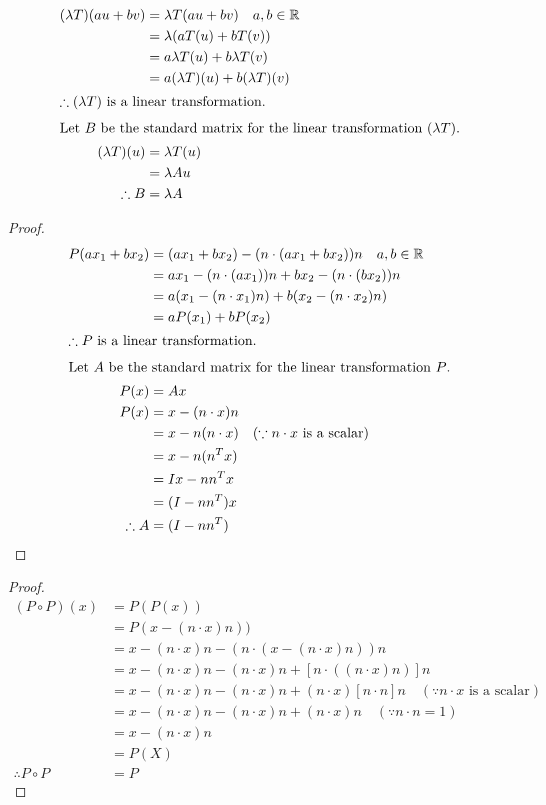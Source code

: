 \documentclass[12pt]{article}
\newenvironment{problem}[2][Problem]{\begin{trivlist}
\item[\hskip \labelsep {\bfseries #1}\hskip \labelsep {\bfseries #2.}]}{\end{trivlist}}
\begin{document}
\begin{problem}{2.b}
\end{problem}
\begin{align*}
(\lambda T)(au + bv) &= \lambda T(au + bv) \quad a, b \in \mathbb{R}\\
&= \lambda (aT(u) + bT(v)) \\
&= a\lambda T(u) + b\lambda T(v) \\
&= a(\lambda T)(u) + b(\lambda T)(v) \\
\intertext{$\therefore (\lambda T)$ is a linear transformation.}
\intertext{Let $B$ be the standard matrix for the linear transformation $(\lambda T)$.}
(\lambda T)(u) &= \lambda T(u)\\ 
&= \lambda Au\\
\therefore B &= \lambda A
\end{align*}
\filbreak

\begin{problem}{3.a}
\end{problem}
\begin{proof}
\begin{align*}
P(ax_1 + bx_2) &= (ax_1 + bx_2) - (n \cdot (ax_1 + bx_2)) n\quad a, b \in \mathbb{R}\\
&= ax_1 - (n \cdot (ax_1)) n + bx_2 - (n \cdot (bx_2)) n\\
&= a(x_1 - (n \cdot x_1) n) + b(x_2 - (n \cdot x_2) n)\\
&= aP(x_1) + bP(x_2)\\
\intertext{$\therefore P$ is a linear transformation.}
\intertext{Let $A$ be the standard matrix for the linear transformation $P$.}
P(x) &= Ax\\
P(x) &= x - (n \cdot x)n\\
&= x - n(n \cdot x) \quad (\text{$\because n \cdot x$ is a scalar}) \\
&= x - n(n^T x) \\
&= Ix - nn^T x\\
&= (I - nn^T) x\\
\therefore A &= (I - nn^T)
\end{align*}
\end{proof}
\filbreak

\begin{problem}{3.b}
\end{problem}
\begin{proof}
\begin{align*}
(P \circ P)(x) &= P (P(x))\\
&= P(x - (n \cdot x)n))\\
&= x - (n \cdot x)n - (n \cdot (x - (n \cdot x)n))n \\
&= x - (n \cdot x)n - (n \cdot x)n + [n \cdot ((n \cdot x)n)]n \\
&= x - (n \cdot x)n - (n \cdot x)n + (n \cdot x)[n \cdot n]n \quad (\text{$\because n \cdot x$ is a scalar}) \\
&= x - (n \cdot x)n - (n \cdot x)n + (n \cdot x)n \quad (\because n \cdot n = 1) \\
&= x - (n \cdot x)n\\
&= P(X)\\
\therefore P \circ P &= P
\end{align*}
\end{proof}
\filbreak
\end{document}
